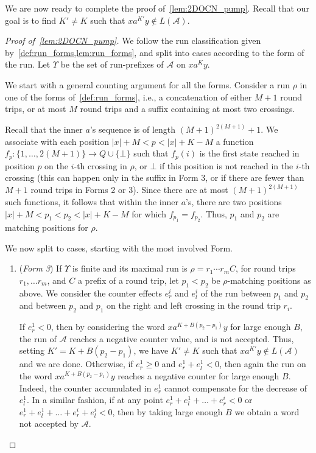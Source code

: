 \documentclass[11pt,a4paper]{amsart}
\theoremstyle{definition}
\newcommand{\shtodo}[1]{\todo[color=cyan!25,size=\small]{SH: #1}}
\newcommand{\cA}{\mathcal{A}}
\begin{document}
We are now ready to complete the proof of~\cref{lem:2DOCN_pump}. Recall that our
goal is to find $K'\neq K$ such that $xa^{K'}y\notin L(\cA)$.
\begin{proof}[Proof of~\cref{lem:2DOCN_pump}]
We follow the run classification given by~\cref{def:run_forms,lem:run_forms},
and split into cases according to the form of the run. Let $\Upsilon$ be the set of
run-prefixes of $\cA$ on $xa^Ky$.

We start with a general counting argument for all the forms. Consider a run
$\rho$ in one of the forms of~\cref{def:run_forms}, i.e., a concatenation of
either $M+1$ round trips, or at most $M$ round trips and a suffix containing
at most two crossings.

Recall that the inner $a$'s sequence is of length $(M+1)^{2(M+1)}+1$. We
associate with each position $|x|+M<p<|x|+K-M$ a function $f_p\colon\{1,\ldots,2(M+1)\}\to
Q\cup \{\bot\}$ such that $f_p(i)$ is the first state reached in position $p$ on the
$i$-th crossing in $\rho$, or $\bot$ if this position is not reached in the $i$-th
crossing (this can happen only in the suffix in Form 3, or if there are fewer
than $M+1$ round trips in Forms 2 or 3). Since there are at most
$(M+1)^{2(M+1)}$ such functions, it follows that within the inner $a$'s, there
are two positions $|x|+M<p_1<p_2<|x|+K-M$ for which $f_{p_1}=f_{p_2}$. Thus,
$p_1$ and $p_2$ are matching positions for $\rho$.

We now split to cases, starting with the most involved Form.
\begin{enumerate}
	\item (\emph{Form 3}) If $\Upsilon$ is finite and its maximal run is $\rho=r_1 \cdots r_m C$,
	for round trips $r_1, \ldots r_m$, and $C$ a prefix of a round trip, let $p_1<p_2$
	be $\rho$-matching positions as above.
	We consider the counter effects $e^i_{r}$ and $e^i_l$ of the run between
	$p_1$ and $p_2$ and between $p_2$ and $p_1$ on the right and left crossing
	in the round trip $r_i$.
	
	If $e^1_{r}<0$, then by considering the word $xa^{K+B(p_2-p_1)}y$ for large
	enough $B$, the run of $\cA$ reaches a negative counter value, and is not
	accepted. Thus, setting $K'=K+B(p_2-p_1)$, we have $K'\neq K$ such that
	$xa^{K'}y\notin L(\cA)$ and we are done.  Otherwise, if $e^1_{r}\ge 0$ and
	$e^1_{r}+e^1_l<0$, then again the run on the word $xa^{K+B(p_2-p_1)}y$
	reaches a negative counter for large enough $B$. Indeed, the counter
	accumulated in $e^1_r$ cannot compensate for the decrease of $e^1_l$.  In a
	similar fashion, if at any point $e^1_r+e^1_l+\ldots +e^i_r<0$ or $e^1_r+e^1_l+\ldots
	+e^i_r +e^i_l<0$, then by taking large enough $B$ we obtain a word not
	accepted by $\cA$.
	

\end{enumerate}
\end{proof}
\end{document}

